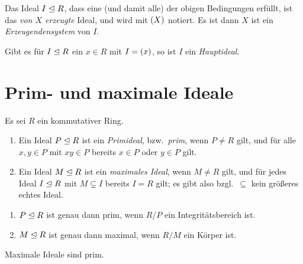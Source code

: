 \begin{definition}
  Das Ideal $I \mathrel{\trianglelefteq} R$, dass eine \textup(und damit alle\textup) der obigen Bedingungen erfüllt, ist das \emph{von $X$ erzeugte} Ideal, und wird mit $(X)$ notiert.
  Es ist dann $X$ ist ein \emph{Erzeugendensystem} von $I$.
\end{definition}

\begin{definition}
  Gibt es für $I \mathrel{\trianglelefteq} R$ ein $x \in R$ mit $I = (x)$, so ist $I$ ein \emph{Hauptideal}.
\end{definition}





\section{Prim- und maximale Ideale}

Es sei $R$ ein kommutativer Ring.

\begin{definition}
  \begin{enumerate}
    \item
      Ein Ideal $P \mathrel{\trianglelefteq} R$ ist ein \emph{Primideal}, bzw.\ \emph{prim}, wenn $P \neq R$ gilt, und für alle $x,y \in P$ mit $xy \in P$ bereits $x \in P$ oder $y \in P$ gilt.
    \item
      Ein Ideal $M \mathrel{\trianglelefteq} R$ ist ein \emph{maximales Ideal}, wenn $M \neq R$ gilt, und für jedes Ideal $I \mathrel{\trianglelefteq} R$ mit $M \subsetneq I$ bereits $I = R$ gilt;
      es gibt also bzgl.\ $\subseteq$ kein größeres echtes Ideal.
  \end{enumerate}
\end{definition}

\begin{lemma}
  \begin{enumerate}
    \item
      $P \mathrel{\trianglelefteq} R$ ist genau dann prim, wenn $R/P$ ein Integritätsbereich ist.
    \item
      $M \mathrel{\trianglelefteq} R$ ist genau dann maximal, wenn $R/M$ ein Körper ist.
  \end{enumerate}
\end{lemma}

\begin{corollary}
  Maximale Ideale sind prim.
\end{corollary}


